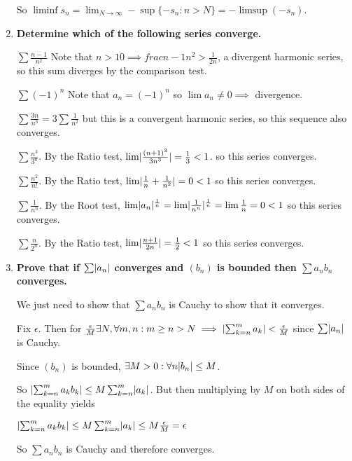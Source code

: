 \documentclass[10pt,a4paper]{article}
\DeclarePairedDelimiter{\abs}{\lvert}{\rvert}
\begin{document}
\begin{enumerate}
        So $\liminf s_n = \lim_{N \to \infty} - \sup \{-s_n : n > N\} = - \limsup (-s_n)$.
        
    \item \textbf{Determine which of the following series converge.}

        $\sum \frac{n-1}{n^2}$ Note that $n> 10 \implies frac{n-1}{n^2} > \frac{1}{2n}$, a divergent harmonic series, so this sum diverges by the comparison test.

        $\sum (-1)^n$ Note that $a_n = (-1)^n$ so $\lim a_n \neq 0 \implies$ divergence.

        $\sum \frac{3n}{n^3}  = 3 \sum \frac{1}{n^2}$ but this is a convergent harmonic series, so this sequence also converges. 

        $\sum {\frac{n^3}{3^n}}$. By the Ratio test, $\lim \abs{\frac{(n+1)^3}{3n^3}} = \frac{1}{3} < 1$. so this series converges.

        $\sum \frac{n^2}{n!}$. By the Ratio test, $\lim \abs{\frac{1}{n} + \frac{1}{n^2}} = 0 < 1$ so this series converges.
    
        $\sum \frac{1}{n^n}$. By the Root test, $\lim \abs{a_n}^{\frac{1}{n}} = \lim \abs{\frac{1}{n^n}}^{\frac{1}{n}} = \lim \frac{1}{n} = 0 < 1$ so this series converges.

        $\sum \frac{n}{2^n}$. By the Ratio test, $\lim \abs{\frac{n+1}{2n}} = \frac{1}{2} < 1$ so this series converges.

    \item \textbf{Prove that if $\sum \abs{a_n}$ converges and $(b_n)$ is bounded then $\sum a_n b_n$ converges.}

        We just need to show that $\sum a_n b_n$ is Cauchy to show that it converges. 
        
        Fix $\epsilon$. Then for $\frac{\epsilon}{M} \exists N ,  \forall m,n : m \geq n > N \implies  \abs{\sum_{k=n}^m a_k} < \frac{\epsilon}M$ since $\sum \abs{a_n}$ is Cauchy.
        
        Since $(b_n)$ is bounded, $\exists M > 0: \forall n \abs{b_n} \leq M$. 

        So $\abs{\sum_{k=n}^m a_k b_k } \leq M \sum_{k=n}^m \abs{a_k}$. But then multiplying by $M$ on both sides of the equality yields

        $\abs{\sum_{k=n}^m a_k b_k } \leq M \sum_{k=n}^m \abs{a_k} \leq M \frac{\epsilon}{M} = \epsilon$

        So $\sum a_n b_n$ is Cauchy and therefore converges.


\end{enumerate}
\end{document}
